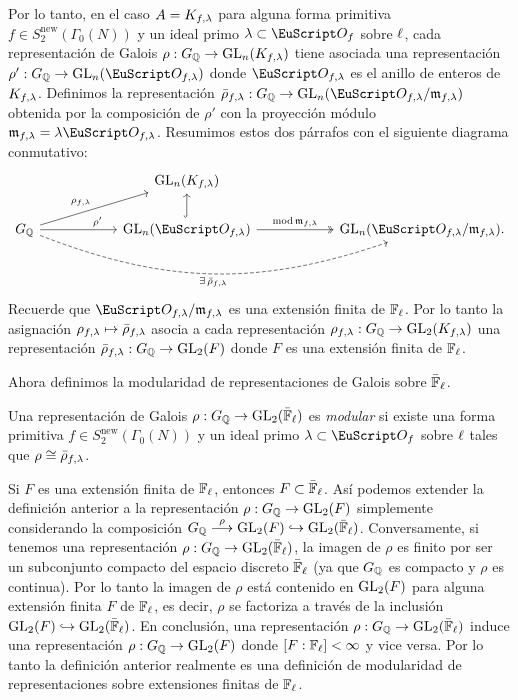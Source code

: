 \documentclass[../../tesis_maestria]{subfiles}
\begin{document}
Por lo tanto, en el caso $A=K_{f,\lambda}$ para alguna forma primitiva $f\in S_2^{\mathrm{new}}(\Gamma_0(N))$ y un ideal primo $\la\subset\Oo_f$ sobre $\ell$, cada representaci\'on de Galois $\rho:G_{\mathbb{Q}}\rightarrow\mathrm{GL}_n(K_{f,\lambda})$  tiene asociada una representaci\'on $\rho':\GQ\ra\GL_n(\Oo_{f,\la})$ donde $\Oo_{f,\la}$ es el anillo de enteros de $K_{f,\lambda}$. Definimos la representaci\'on $\bar{\rho}_{f,\la}:\GQ\ra\GL_n(\Oo_{f,\la}/\m_{f,\la})$ obtenida por la composici\'on de $\rho'$ con la proyecci\'on m\'odulo $\m_{f,\la}=\la\Oo_{f,\la}$. Resumimos estos dos p\'arrafos con el siguiente diagrama conmutativo:
\begin{equation}\label{cd:rhobarra}
  \begin{tikzcd}[column sep=20mm]
    & \GL_n(K_{f,\la}) & \\
    \GQ \arrow[r,near end,"\rho'"] \arrow[ur,"\rho_{f,\la}"]
    \arrow[rr,bend right=20,dashed,"\exists\,\bar{\rho}_{f,\la}"']&
    \GL_n(\Oo_{f,\la}) \arrow[r,two heads,"\mathrm{mod}\,\m_{f,\la}"]
    \arrow[u,hook]&
    \GL_n(\Oo_{f,\la}/\m_{f,\la}).
  \end{tikzcd}
\end{equation}
Recuerde que $\Oo_{f,\la}/\m_{f,\la}$ es una extensi\'on finita de $\mathbb{F}_{\ell}$. Por lo tanto la asignaci\'on $\rho_{f,\lambda}\mapsto\bar{\rho}_{f,\lambda}$ asocia a cada representaci\'on $\rho_{f,\lambda}:G_{\mathbb{Q}}\rightarrow\mathrm{GL}_2(K_{f,\lambda})$ una representaci\'on $\bar{\rho}_{f,\lambda}:G_{\mathbb{Q}}\rightarrow\mathrm{GL}_2(F)$ donde $F$ es una extensi\'on finita de $\mathbb{F}_{\ell}$.

Ahora definimos la modularidad de representaciones de Galois sobre $\bar{\mathbb{F}}_{\ell}$.

\begin{defin}
  Una representaci\'on de Galois $\rho:G_{\mathbb{Q}}\rightarrow\mathrm{GL}_2(\bar{\mathbb{F}}_{\ell})$ es \emph{modular} si existe una forma primitiva $f\in S_2^{\mathrm{new}}(\Gamma_0(N))$ y un ideal primo $\la\subset\Oo_f$ sobre $\ell$ tales que $\rho\cong\bar{\rho}_{f,\lambda}$.
\end{defin}

\begin{nota}
  Si $F$ es una extensi\'on finita de $\mathbb{F}_{\ell}$, entonces $F\subset\bar{\mathbb{F}}_{\ell}$. As\'i podemos extender la definici\'on anterior a la representaci\'on $\rho:G_{\mathbb{Q}}\rightarrow\mathrm{GL}_2(F)$ simplemente considerando la composici\'on $G_{\mathbb{Q}}\overset{\rho}{\longrightarrow}\mathrm{GL}_2(F)\hookrightarrow\mathrm{GL}_2(\bar{\mathbb{F}}_{\ell})$. Conversamente, si tenemos una representaci\'on $\rho:G_{\mathbb{Q}}\rightarrow\mathrm{GL}_2(\bar{\mathbb{F}}_{\ell})$, la imagen de $\rho$ es finito por ser un subconjunto compacto del espacio discreto $\bar{\mathbb{F}}_{\ell}$ (ya que $G_{\mathbb{Q}}$ es compacto y $\rho$ es continua). Por lo tanto la imagen de $\rho$ est\'a contenido en $\mathrm{GL}_2(F)$ para alguna extensi\'on finita $F$ de $\mathbb{F}_{\ell}$, es decir, $\rho$ se factoriza a trav\'es de la inclusi\'on $\mathrm{GL}_2(F)\hookrightarrow\mathrm{GL}_2(\bar{\mathbb{F}}_{\ell})$.
  En conclusi\'on, una representaci\'on $\rho:G_{\mathbb{Q}}\rightarrow\mathrm{GL}_2(\bar{\mathbb{F}}_{\ell})$ induce una representaci\'on $\rho:G_{\mathbb{Q}}\rightarrow\mathrm{GL}_2(F)$ donde $[F:\mathbb{F}_{\ell}]<\infty$ y vice versa. Por lo tanto la definici\'on anterior realmente es una definici\'on de modularidad de representaciones sobre extensiones finitas de $\mathbb{F}_{\ell}$.
\end{nota}
\end{document}
